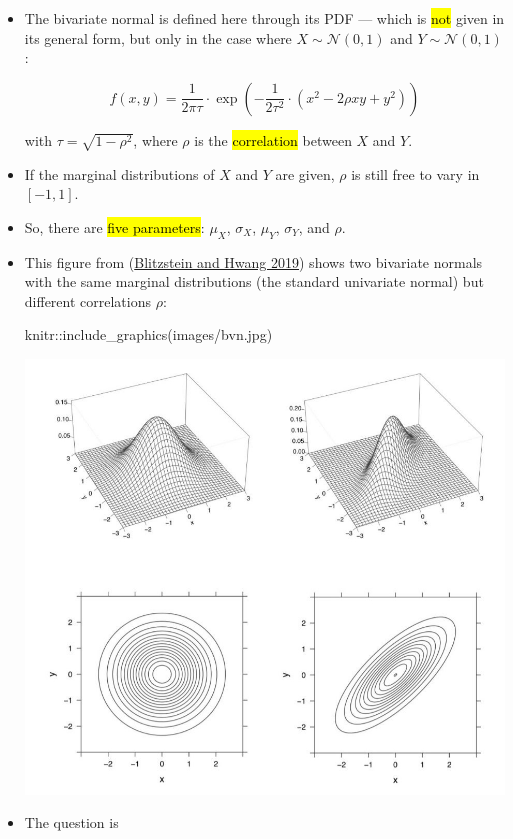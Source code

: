 \documentclass[
  11pt]{report}
\newenvironment{Shaded}{\begin{snugshade}}{\end{snugshade}}
\newcommand{\FunctionTok}[1]{\textcolor[rgb]{0.00,0.00,0.00}{#1}}
\newcommand{\NormalTok}[1]{#1}
\newcommand{\SpecialCharTok}[1]{\textcolor[rgb]{0.00,0.00,0.00}{#1}}
\newcommand{\StringTok}[1]{\textcolor[rgb]{0.31,0.60,0.02}{#1}}
\renewenvironment{Shaded}{
    \begin{mdframed}[%
      roundcorner=2pt,%
      innerleftmargin=5pt,%
      innerrightmargin=5pt,%
      topline=true,%
      leftline=true,%
      rightline=true,%
      bottomline=true,%
      linewidth=0.5pt,%
      linecolor=black!20,%
      backgroundcolor=black!2,%
      skipabove=2ex,%
      skipbelow=2.5ex%
    ]%
  }
  {
    \end{mdframed}
  }
\begin{document}
\begin{itemize}
\item
  The bivariate normal is defined here through its PDF --- which is {\hl{not}} given in its general form, but only in the case where $X \sim \mathcal N(0, 1)$ and $Y \sim \mathcal N(0, 1)$:

  \[
  f(x, y) = \frac{1}{2\pi\tau} \cdot 
  \exp\left(
    -\frac{1}{2\tau^2} \cdot (x^2 - 2\rho xy + y^2)
  \right)
  \]

  with $\tau = \sqrt{1 - \rho^2}$, where $\rho$ is the {\hl{correlation}} between $X$ and $Y$.
\item
  If the marginal distributions of $X$ and $Y$ are given, $\rho$ is still free to vary in $[-1, 1]$.
\item
  So, there are {\hl{five parameters}}: $\mu_X$, $\sigma_X$, $\mu_Y$, $\sigma_Y$, and $\rho$.
\item
  This figure from (\protect\hyperlink{ref-JosephK.Blitzstein989}{Blitzstein and Hwang 2019}) shows two bivariate normals with the same marginal distributions (the standard univariate normal) but different correlations $\rho$:

\begin{Shaded}
\begin{Highlighting}[]
\NormalTok{knitr}\SpecialCharTok{::}\FunctionTok{include\_graphics}\NormalTok{(}\StringTok{\textquotesingle{}images/bvn.jpg\textquotesingle{}}\NormalTok{)}
\end{Highlighting}
\end{Shaded}

  \begin{center}\includegraphics[width=1\linewidth]{images/bvn} \end{center}
\item
  The question is


\end{itemize}
\end{document}
